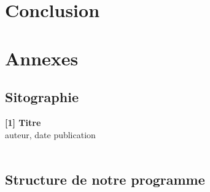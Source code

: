 \documentclass{article}
\begin{document}
\newpage
\vspace*{2cm}
\section{Conclusion}
\vspace*{0,5cm}


\break
\newpage
\section{Annexes}

\subsection{Sitographie}

\noindent
\textbf{[1] Titre }\\
\noindent
auteur, 
date publication  
\\
\noindent
\url{  }\\





\subsection{Structure de notre programme}
\end{document}
